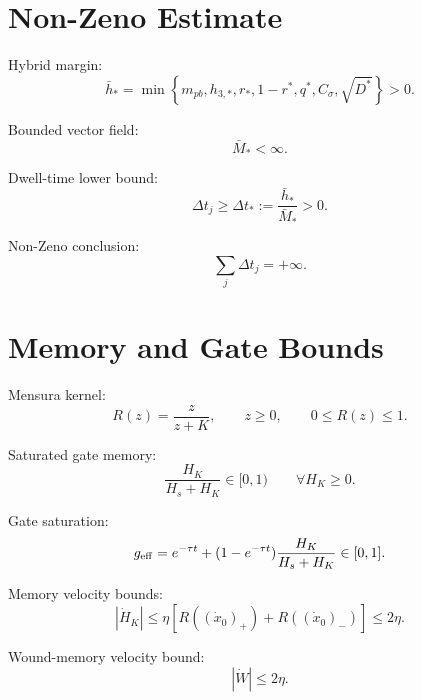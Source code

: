\documentclass[11pt,a4paper]{article}
\theoremstyle{remark}
\begin{document}
\section{Non-Zeno Estimate}

Hybrid margin:
\begin{equation}
  \bar h_*=
  \min\left\{m_{pb},h_{3,*},r_*,1-r^*,q^*,C_\sigma,\sqrt{D^*}\right\}>0.
\end{equation}

Bounded vector field:
\begin{equation}
  \bar M_*<\infty.
\end{equation}

Dwell-time lower bound:
\begin{equation}
  \Delta t_j\ge \Delta t_*:=\frac{\bar h_*}{\bar M_*}>0.
\end{equation}

Non-Zeno conclusion:
\begin{equation}
  \sum_j \Delta t_j=+\infty.
\end{equation}

\section{Memory and Gate Bounds}

Mensura kernel:
\begin{equation}
  R(z)=\frac{z}{z+K},
  \qquad
  z\ge0,
  \qquad
  0\le R(z)\le1.
\end{equation}

Saturated gate memory:
\begin{equation}
  \frac{H_K}{H_s+H_K}\in[0,1)
  \qquad
  \forall H_K\ge0.
\end{equation}

Gate saturation:
\begin{equation}
  g_{\rm eff}=e^{-\tau t}+(1-e^{-\tau t})\frac{H_K}{H_s+H_K}\in[0,1].
\end{equation}

Memory velocity bounds:
\begin{equation}
  |\dot H_K|\le \eta\left[R((\dot x_0)_+)+R((\dot x_0)_-)\right]\le 2\eta.
\end{equation}

Wound-memory velocity bound:
\begin{equation}
  |\dot W|\le2\eta.
\end{equation}
\end{document}
